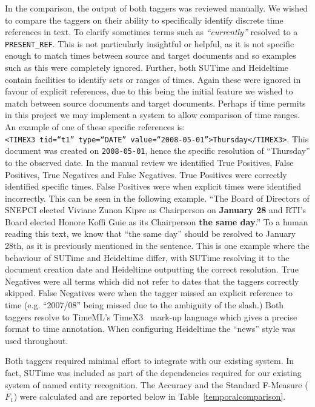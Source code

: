 \documentclass{mprop}
\newcommand{\code}[1]{\texttt{#1}}
\let\oldcite=\cite
\renewcommand\cite[1]{\ifthenelse{\equal{#1}{NEEDED}}{\ensuremath{^\texttt{[citation~needed]}}}{\oldcite{#1}}}
\begin{document}
In the comparison, the output of both taggers was reviewed manually. We wished to compare the taggers on their ability to specifically identify discrete time references in text. 
To clarify sometimes terms such as \textit{``currently''} resolved to a \code{PRESENT\_REF}. 
This is not particularly insightful or helpful, as it is not specific enough to match times between source and target documents and so examples such as this were completely ignored. 
Further, both SUTime and Heideltime contain facilities to identify sets or ranges of times. 
Again these were ignored in favour of explicit references, due to this being the initial feature we wished to match between source documents and target documents. 
Perhaps if time permits in this project we may implement a system to allow comparison of time ranges. 
An example of one of these specific references is: 
\\ \code{<TIMEX3 tid=``t1'' type=``DATE'' value=``2008-05-01''>Thursday</TIMEX3>}.
This document was created on \code{2008-05-01}, hence the specific resolution of ``Thursday'' to the observed date.
In the manual review we identified True Positives, False Positives, True Negatives and False Negatives. True Positives were correctly identified specific times. False Positives were when explicit times were identified incorrectly. This can be seen in the following example. ``The Board of Directors of SNEPCI elected Viviane Zunon Kipre as Chairperson on \textbf{January 28} and RTI's Board elected Honore Koffi Guie as its Chairperson \textbf{the same day}.'' To a human reading this text, we know that ``the same day'' should be resolved to January 28th, as it is previously mentioned in the sentence. This is one example where the behaviour of SUTime and Heideltime differ, with SUTime resolving it to the document creation date and Heideltime outputting the correct resolution. True Negatives were all terms which did not refer to dates that the taggers correctly skipped. False Negatives were when the tagger missed an explicit reference to time (e.g. ``2007/08'' being missed due to the ambiguity of the slash.)
Both taggers resolve to TimeML's TimeX3~\cite{timeml} mark-up language which gives a precise format to time annotation.
When configuring Heideltime the ``news'' style was used throughout.

Both taggers required minimal effort to integrate with our existing system. In fact, SUTime was included as part of the dependencies required for our existing system of named entity recognition. The Accuracy and the Standard F-Measure (\textbf{$ F_1 $}) were calculated and are reported below in Table~\ref{temporalcomparison}.
\end{document}
